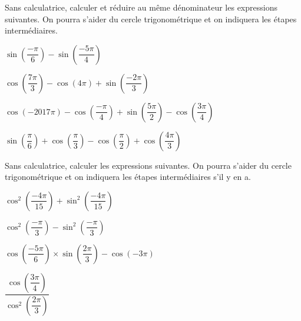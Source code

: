 \documentclass[11pt,a4paper]{article}  %
\begin{document}
Sans calculatrice, calculer et réduire au même dénominateur les expressions suivantes. On pourra s'aider du cercle trigonométrique et on indiquera les étapes intermédiaires.
\begin{enumMet}
	\item $\sin \left(\dfrac{-\pi}{6}\right)-\sin \left(\dfrac{-5 \pi}{4}\right)$\quad {}
	\item $\cos \left(\dfrac{7 \pi}{3}\right)-\cos (4 \pi)+\sin \left(\dfrac{-2\pi}{3}\right)$\quad {}
	\item $\cos (-2017 \pi)-\cos \left(\dfrac{-\pi}{4}\right)+\sin \left(\dfrac{5 \pi}{2}\right)-\cos \left(\dfrac{3\pi}{4}\right)$\quad
	
	\item $\sin \left(\dfrac{\pi}{6}\right)+\cos \left(\dfrac{\pi}{3}\right)-\cos \left(\dfrac{\pi}{2}\right)+\cos \left(\dfrac{4 \pi}{3}\right)$ \quad 
	
\end{enumMet}

\exercice{}

Sans calculatrice, calculer les expressions suivantes. On pourra s'aider du cercle trigonométrique et on indiquera les étapes intermédiaires s'il y en a.
\begin{enumMet}
	\item $\cos ^2\left(\dfrac{-4\pi}{15}\right)+\sin ^2\left(\dfrac{-4\pi}{15}\right)$ 
	\item $\cos ^2\left(\dfrac{-\pi}{3}\right)-\sin ^2\left(\dfrac{-\pi}{3}\right)$\quad {}
	\item $\cos \left(\dfrac{-5 \pi}{6}\right) \times \sin \left(\dfrac{2 \pi}{3}\right)-\cos (-3\pi)$
	
	\item $\dfrac{\cos \left(\dfrac{3\pi}{4}\right)}{\cos ^2\left(\dfrac{2\pi}{3}\right)}$\quad {}
\end{enumMet}
\end{document}
